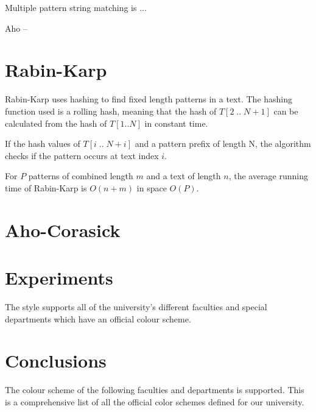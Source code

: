 \documentclass[final]{beamer}
\author{Aleksi Hartikainen and Jussi Kokkala}
\begin{document}
\begin{poster}

\newcolumn

Multiple pattern string matching is ...

Aho --

\section{Rabin-Karp}
      Rabin-Karp uses hashing to find fixed length patterns in a text. The hashing function used is a rolling hash, meaning that the hash of $T[2\;..\;N+1]$ can be calculated from the hash of $T[1..N]$ in constant time. 
     
If the hash values of $T[i\;..\;N+i]$ and a pattern prefix of length N, the algorithm checks if the pattern occurs at text index $i$.

    For $P$ patterns of combined length $m$  and a text of length $n$, the average running time of Rabin-Karp is $O(n+m)$ in space $O(P)$.


\section{Aho-Corasick}

\newcolumn
\section{Experiments}

The style supports all of the university's different faculties and special departments which have an official colour scheme.


\section{Conclusions}

The colour scheme of the following faculties and departments is supported. This is a comprehensive list of all the official color schemes defined for our university.


\end{poster}
\end{document}
